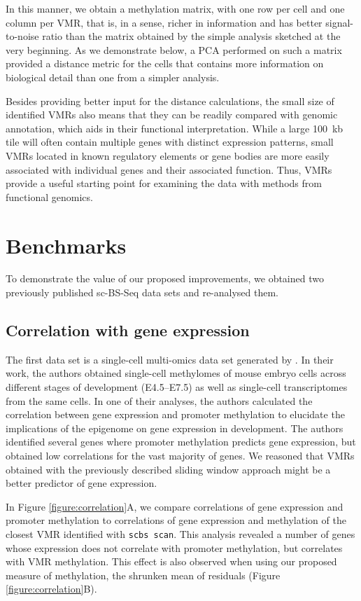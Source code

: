 \documentclass[twocolumn,10pt]{article}
\begin{document}
In this manner, we obtain a methylation matrix, with one row per cell and one column per VMR, that is, in a sense, richer in information and has better signal-to-noise ratio than the matrix obtained by the simple analysis sketched at the very beginning. As we demonstrate below, a PCA performed on such a matrix provided a distance metric for the cells that contains more information on biological detail than one from a simpler analysis. 

Besides providing better input for the distance calculations, the small size of identified VMRs also means that they can be readily compared with genomic annotation, which aids in their functional interpretation.
While a large 100~kb tile will often contain multiple genes with distinct expression patterns, small VMRs located in known regulatory elements or gene bodies are more easily associated with individual genes and their associated function.
Thus, VMRs provide a useful starting point for examining the data with methods from functional genomics.

\section{Benchmarks}

To demonstrate the value of our proposed improvements, we obtained two previously published sc-BS-Seq data sets and re-analysed them.

\subsection{Correlation with gene expression}

The first data set is a single-cell multi-omics data set generated by \citet{argelaguet2019gastru}. In their work, the authors obtained single-cell methylomes of mouse embryo cells across different stages of development (E4.5--E7.5) as well as single-cell transcriptomes from the same cells. In one of their analyses, the authors calculated the correlation between gene expression and promoter methylation to elucidate the implications of the epigenome on gene expression in development. The authors identified several genes where promoter methylation predicts gene expression, but obtained low correlations for the vast majority of genes. We reasoned that VMRs obtained with the previously described sliding window approach might be a better predictor of gene expression. 

In Figure \ref{figure:correlation}A, we compare correlations of gene expression and promoter methylation to correlations of gene expression and methylation of the closest VMR identified with \texttt{scbs scan}.
This analysis revealed a number of genes whose expression does not correlate with promoter methylation, but correlates with VMR methylation.
This effect is also observed when using our proposed measure of methylation, the shrunken mean of residuals (Figure \ref{figure:correlation}B).
\end{document}
